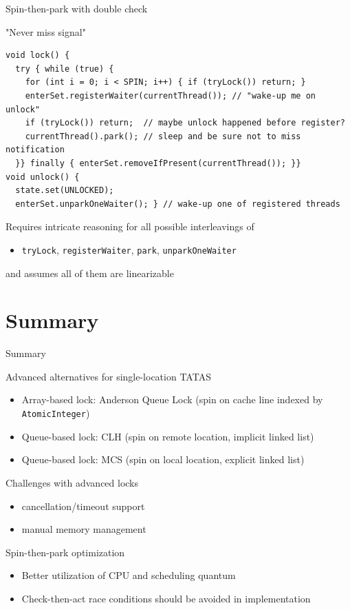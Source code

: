 \begin{frame}[fragile]{Spin-then-park with double check}

"Never miss signal"

\begin{verbatim}
void lock() {
  try { while (true) { 
    for (int i = 0; i < SPIN; i++) { if (tryLock()) return; }    
    enterSet.registerWaiter(currentThread()); // "wake-up me on unlock"
    if (tryLock()) return;  // maybe unlock happened before register?
    currentThread().park(); // sleep and be sure not to miss notification
  }} finally { enterSet.removeIfPresent(currentThread()); }}
void unlock() { 
  state.set(UNLOCKED); 
  enterSet.unparkOneWaiter(); } // wake-up one of registered threads
\end{verbatim}

\pause

Requires intricate reasoning for all possible interleavings of
\begin{itemize}
  \item \texttt{tryLock}, \texttt{registerWaiter}, \texttt{park}, \texttt{unparkOneWaiter}
\end{itemize}
and assumes all of them are linearizable


\end{frame}

\section{Summary}

\begin{frame}{Summary}

Advanced alternatives for single-location TATAS
\begin{itemize}
  \item Array-based lock: Anderson Queue Lock (spin on cache line indexed by \texttt{AtomicInteger})
  \item Queue-based lock: CLH (spin on remote location, implicit linked list)
  \item Queue-based lock: MCS (spin on local location, explicit linked list)
\end{itemize}

Challenges with advanced locks
\begin{itemize}
  \item cancellation/timeout support
  \item manual memory management
\end{itemize}

Spin-then-park optimization
\begin{itemize}
  \item Better utilization of CPU and scheduling quantum
  \item Check-then-act race conditions should be avoided in implementation
\end{itemize}

\end{frame}


